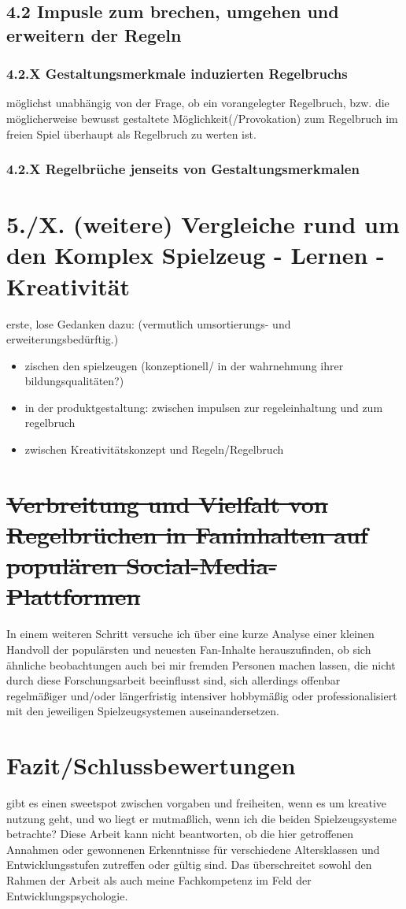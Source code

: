 \documentclass[11pt,a4paper,twoside]{scrreprt}
\begin{document}
	\section{4.2 Impusle zum brechen, umgehen und erweitern der Regeln}
		\subsection{4.2.X Gestaltungsmerkmale induzierten Regelbruchs}
		möglichst unabhängig von der Frage, ob ein vorangelegter Regelbruch, bzw. die möglicherweise bewusst gestaltete Möglichkeit(/Provokation) zum Regelbruch im freien Spiel überhaupt als Regelbruch zu werten ist.

		\subsection{4.2.X Regelbrüche jenseits von Gestaltungsmerkmalen}

\chapter{5./X. (weitere) Vergleiche rund um den Komplex Spielzeug - Lernen - Kreativität}
	erste, lose Gedanken dazu: (vermutlich umsortierungs- und erweiterungsbedürftig.)
	\begin{itemize}
		\item zischen den spielzeugen (konzeptionell/ in der wahrnehmung ihrer bildungsqualitäten?)
		\item in der produktgestaltung: zwischen impulsen zur regeleinhaltung und zum regelbruch
		\item zwischen Kreativitätskonzept und Regeln/Regelbruch
	\end{itemize}


\chapter{\sout{Verbreitung und Vielfalt von Regelbrüchen in Faninhalten auf populären Social-Media-Plattformen}}
In einem weiteren Schritt versuche ich über eine kurze Analyse einer kleinen Handvoll der populärsten und neuesten Fan-Inhalte herauszufinden, ob sich ähnliche beobachtungen auch bei mir fremden Personen machen lassen, die nicht durch diese Forschungsarbeit beeinflusst sind, sich allerdings offenbar regelmäßiger und/oder längerfristig intensiver hobbymäßig oder professionalisiert mit den jeweiligen Spielzeugsystemen auseinandersetzen.


\chapter{Fazit/Schlussbewertungen}
gibt es einen sweetspot zwischen vorgaben und freiheiten, wenn es um kreative nutzung geht, und wo liegt er mutmaßlich, wenn ich die beiden Spielzeugsysteme betrachte? Diese Arbeit kann nicht beantworten, ob die hier getroffenen Annahmen oder gewonnenen Erkenntnisse für verschiedene Altersklassen und Entwicklungsstufen zutreffen oder gültig sind. Das überschreitet sowohl den Rahmen der Arbeit als auch meine Fachkompetenz im Feld der Entwicklungspsychologie.
\end{document}

